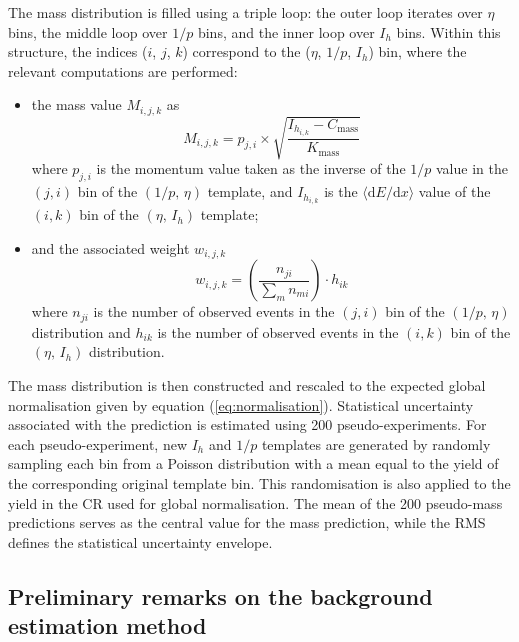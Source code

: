 The mass distribution is filled using a triple loop: the outer loop iterates over $\eta$ bins, the middle loop over $1/p$ bins, and the inner loop over $I_h$ bins. Within this structure, the indices ($i$, $j$, $k$) correspond to the ($\eta$, $1/p$, $I_h$) bin, where the relevant computations are performed:

\begin{itemize}
  \item the mass value $M_{i,j,k}$ as
  \begin{equation}
    M_{i,j,k} = p_{j,i} \times \sqrt{\frac{I_{h_{i,k}}-C_\mathrm{mass}}{K_\mathrm{mass}} }
  \end{equation}
  where $p_{j,i}$ is the momentum value taken as the inverse of the $1/p$ value in the $(j,i)$ bin of the $(1/p,\,\eta)$ template, and $I_{h_{i,k}}$ is the $\langle\mathrm{d}E/\mathrm{d}x\rangle$ value of the $(i,k)$ bin of the $(\eta,\,I_h)$ template;
  
  \item and the associated weight $w_{i,j,k}$
  \begin{equation}
    w_{i,j,k} = \left(\frac{n_{ji}}{\sum_m n_{mi}}\right) \cdot h_{ik}
  \end{equation}
  where $n_{ji}$ is the number of observed events in the $(j,i)$ bin of the $(1/p,\,\eta)$ distribution and $h_{ik}$ is the number of observed events in the $(i,k)$ bin of the $(\eta,\,I_h)$ distribution.
\end{itemize}

The mass distribution is then constructed and rescaled to the expected global normalisation given by equation (\ref{eq:normalisation}). Statistical uncertainty associated with the prediction is estimated using 200 pseudo-experiments. For each pseudo-experiment, new $I_h$ and $1/p$ templates are generated by randomly sampling each bin from a Poisson distribution with a mean equal to the yield of the corresponding original template bin. This randomisation is also applied to the yield in the CR used for global normalisation. The mean of the 200 pseudo-mass predictions serves as the central value for the mass prediction, while the RMS defines the statistical uncertainty envelope.


\subsection{Preliminary remarks on the background estimation method}
\label{sec:abcd_remarks}

